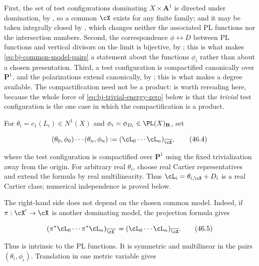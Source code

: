 First, the set of test configurations dominating $X\times\mathbf A^1$ is
directed under domination, by , so a common
$\cX$ exists for any finite family; and it may be taken integrally
closed by , which changes neither
the associated PL functions nor the intersection numbers.  Second, the
correspondence $\phi\leftrightarrow D$ between PL functions and vertical
divisors on the limit is bijective, by ;
this is what makes \eqref{eq:bj-common-model-pairs} a statement about the
functions $\phi_i$ rather than about a chosen presentation.  Third, a
test configuration is compactified canonically over $\mathbf P^1$, and
the polarizations extend canonically, by ;
this is what makes a degree available.  The compactification need not be a product:
 is worth rereading here,
because the whole force of \eqref{eq:bj-trivial-energy-zero} below is that
the \emph{trivial} test configuration is the one case in which the
compactification is a product.

\begin{definition}
\label{def:bj-pl-energy-pairing}
For $\theta_i=c_1(L_i)\in N^1(X)$ and
$\phi_i=\phi_{D_i}\in\PL(X)_{\mathbf R}$, set

\[
 (\theta_0,\phi_0)\cdots(\theta_n,\phi_n)
 :=(\cL_0\cdots\cL_n)_{\overline{\cX}},
\tag{46.4}\label{eq:bj-pl-energy-intersection}
\]

where the test configuration is compactified over $\mathbf P^1$ using
the fixed trivialization away from the origin. For arbitrary real
$\theta_i$, choose real Cartier representatives and extend the formula
by real multilinearity. Thus $\cL_i=\theta_{i,\cX}+D_i$ is a real
Cartier class; numerical independence is proved below.
\end{definition}

The right-hand side does not depend on the chosen common model.  Indeed,
if $\pi:\cX'\to\cX$ is another dominating model, the
projection formula gives

\[
 (\pi^*\cL_0\cdots\pi^*\cL_n)_{\overline{\cX}' }
       =(\cL_0\cdots\cL_n)_{\overline{\cX}}.
\tag{46.5}\label{eq:bj-energy-projection}
\]

Thus  is intrinsic to the PL
functions.  It is symmetric and multilinear in the pairs
$(\theta_i,\phi_i)$.  Translation in one metric variable gives

